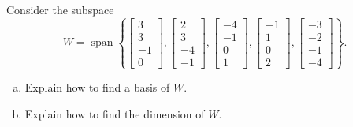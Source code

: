 
\begin{exerciseStatement}


Consider the subspace \[W=\operatorname{span}  \left\{ \left[\begin{array}{c}
3 \\
3 \\
-1 \\
0
\end{array}\right] , \left[\begin{array}{c}
2 \\
3 \\
-4 \\
-1
\end{array}\right] , \left[\begin{array}{c}
-4 \\
-1 \\
0 \\
1
\end{array}\right] , \left[\begin{array}{c}
-1 \\
1 \\
0 \\
2
\end{array}\right] , \left[\begin{array}{c}
-3 \\
-2 \\
-1 \\
-4
\end{array}\right] \right\} .\]


\begin{enumerate}[(a)]
\item  Explain how to find a basis of \(W\).
\item  Explain how to find the dimension of \(W\).
\end{enumerate}
    
\end{exerciseStatement}
    
